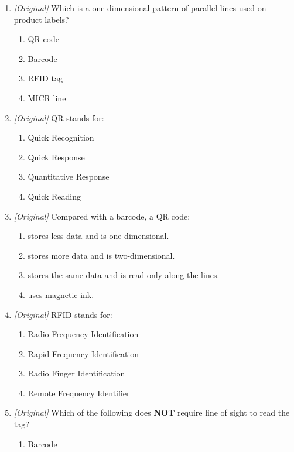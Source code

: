 \documentclass[11pt]{article}
\begin{document}
\begin{enumerate}[label=\textbf{Q\arabic*.}, leftmargin=*]
\begin{enumerate}[label=\Alph*.]
    \item MICR --- magnetic-ink characters
    \item OMR --- characters printed in magnetic ink
  \end{enumerate}
\item \textit{[Original]} Which is a one-dimensional pattern of parallel
  lines used on product labels?
  \begin{enumerate}[label=\Alph*.]
    \item QR code
    \item Barcode
    \item RFID tag
    \item MICR line
  \end{enumerate}
\item \textit{[Original]} QR stands for:
  \begin{enumerate}[label=\Alph*.]
    \item Quick Recognition
    \item Quick Response
    \item Quantitative Response
    \item Quick Reading
  \end{enumerate}
\item \textit{[Original]} Compared with a barcode, a QR code:
  \begin{enumerate}[label=\Alph*.]
    \item stores less data and is one-dimensional.
    \item stores more data and is two-dimensional.
    \item stores the same data and is read only along the lines.
    \item uses magnetic ink.
  \end{enumerate}
\item \textit{[Original]} RFID stands for:
  \begin{enumerate}[label=\Alph*.]
    \item Radio Frequency Identification
    \item Rapid Frequency Identification
    \item Radio Finger Identification
    \item Remote Frequency Identifier
  \end{enumerate}
\item \textit{[Original]} Which of the following does \textbf{NOT} require
  line of sight to read the tag?
  \begin{enumerate}[label=\Alph*.]
    \item Barcode

\end{enumerate}
\end{enumerate}
\end{document}
